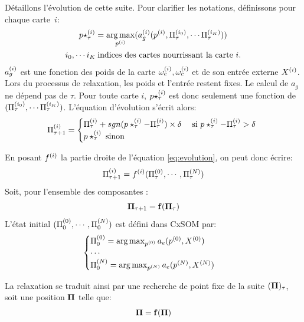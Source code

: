Détaillons l'évolution de cette suite. Pour clarifier les notations, définissons pour chaque carte~$i$:
\begin{equation}
\begin{gathered}
p\star^{({i})}_{\tau} = \operatorname*{arg\,max}_{p^{({i})}}(a_g^{({i})}(p^{({i})},\Pi^{({i_0})}_\tau, \cdots \Pi^{({i_K})}_\tau))\\
 i_0, \cdots i_K \: \text{indices des cartes nourrissant la carte $i$}.
\end{gathered}
\label{eq:pstar}
\end{equation}
$a_g^{({i})}$ est une fonction des poids de la carte $\omega_{e}^{({i})}, \omega_{c}^{({i})}$ et de son entrée externe $X^{({i})}$. Lors du processus de relaxation, les poids et l'entrée restent fixes. Le calcul de $a_g$ ne dépend pas de $\tau$.
Pour toute carte $i$, $p\star^{({i})}_{\tau}$ est donc seulement une fonction de $(\Pi^{({i_0})}_\tau, \cdots \Pi^{({i_K})}_\tau)$.
L'équation d'évolution s'écrit alors: 
\begin{equation}
\Pi^{({i})}_{\tau+1} = 
\begin{cases}
\Pi^{({i})}_{\tau} + sgn(p\star^{({i})}_{\tau} - \Pi^{({i})}_{\tau}) \times \delta \; & \text{si $p\star^{({i})}_{\tau} - \Pi^{({i})}_{\tau} > \delta$ } \\
p\star^{({i})}_{\tau} \; \text{sinon}	
\end{cases}
\label{eq:evolution}
\end{equation}

En posant $f^{({i})}$ la partie droite de l'équation \ref{eq:evolution}, on peut donc écrire: 
\begin{equation}
\Pi^{({i})}_{\tau +1} = f^{({i})}(\Pi^{({0})}_\tau,\cdots,\Pi^{({N})}_\tau)
\label{eq:fonction}
\end{equation}
Soit, pour l'ensemble des composantes : 
\begin{equation*}
\mathbf{\Pi}_{\tau+1} = \mathbf{f}(\mathbf{\Pi}_\tau)
\end{equation*}
L'état initial $(\Pi^{({0})}_0, \cdots , \Pi^{({N})}_0)$ est défini dans CxSOM par: 
\begin{equation}
\begin{cases}
\Pi^{({0})}_0 = \operatorname*{arg\,max}_{p^{({0})}} a_e(p^{({0})},X^{({0})})\\
\cdots \\
\Pi^{({N})}_0 = \operatorname*{arg\,max}_{p^{({N})}} a_e(p^{({N})},X^{({N})})\\
\end{cases}
\label{eq:init}
\end{equation}

La relaxation se traduit ainsi par une recherche de point fixe de la suite $(\mathbf{\Pi})_{\tau}$, soit une position $\mathbf{\Pi}$ telle que:
\begin{equation}
\mathbf{\Pi} = \mathbf{f}(\mathbf{\Pi})
\label{eq:suite}
\end{equation}

